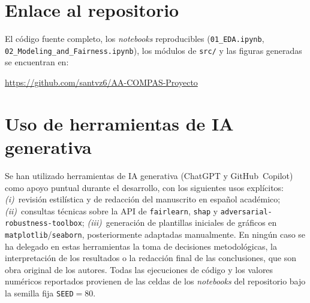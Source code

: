 \documentclass[11pt,a4paper]{article}
\begin{document}
\section{Enlace al repositorio}

El código fuente completo, los \textit{notebooks} reproducibles (\texttt{01\_EDA.ipynb}, \texttt{02\_Modeling\_and\_Fairness.ipynb}), los módulos de \texttt{src/} y las figuras generadas se encuentran en:
\begin{center}
\url{https://github.com/santvz6/AA-COMPAS-Proyecto}
\end{center}

\section{Uso de herramientas de IA generativa}

Se han utilizado herramientas de IA generativa (ChatGPT y GitHub~Copilot) como apoyo puntual durante el desarrollo, con los siguientes usos explícitos: \emph{(i)}~revisión estilística y de redacción del manuscrito en español académico; \emph{(ii)}~consultas técnicas sobre la API de \texttt{fairlearn}, \texttt{shap} y \texttt{adversarial-robustness-toolbox}; \emph{(iii)}~generación de plantillas iniciales de gráficos en \texttt{matplotlib}/\texttt{seaborn}, posteriormente adaptadas manualmente. En ningún caso se ha delegado en estas herramientas la toma de decisiones metodológicas, la interpretación de los resultados o la redacción final de las conclusiones, que son obra original de los autores. Todas las ejecuciones de código y los valores numéricos reportados provienen de las celdas de los \textit{notebooks} del repositorio bajo la semilla fija \texttt{SEED}$=80$.
\end{document}
